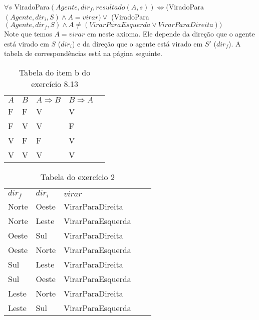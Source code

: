 \documentclass[12pt,letterpaper]{article}
\begin{document}
	$\forall s$ ViradoPara$(Agente, dir_f, resultado(A, s)) \Leftrightarrow $(ViradoPara$(Agente, dir_i, S)\land A = virar) \lor $ (ViradoPara$(Agente, dir_f, S) \land A \neq (VirarParaEsquerda \lor VirarParaDireita))$ \\
	
	Note que temos $A = virar$ em neste axioma. Ele depende da direção que o agente está virado em $S$ ($dir_i$) e da direção que o agente está virado em $S'$ ($dir_f$). A tabela de correspondências está na página seguinte.
	
	
	\newpage 
	
	\begin{table}[]
		\centering
		\caption{Tabela do item b do exercício 8.13}
		\label{my-label}
		\begin{tabular}{|l|l|l|l|l}
			\cline{1-4}
			$A$ & $B$ & $A \Rightarrow B$ & $B \Rightarrow A$ &  \\ \cline{1-4}
			F   & F   & V                 & V                 &  \\ \cline{1-4}
			F   & V   & V                 & F                 &  \\ \cline{1-4}
			V   & F   & F                 & V                 &  \\ \cline{1-4}
			V   & V   & V                 & V                 &  \\ \cline{1-4}
		\end{tabular}
	\end{table}
	
	\begin{table}[]
		\centering
		\caption{Tabela do exercício 2}
		\label{my-label}
		\begin{tabular}{|l|l|l|ll}
			\cline{1-3}
			$dir_f$ & $dir_i$ & $virar$             &  &  \\ \cline{1-3}
			Norte   & Oeste   & VirarParaDireita    &  &  \\ \cline{1-3}
			Norte   & Leste   & VirarParaEsquerda   &  &  \\ \cline{1-3}
		    Oeste   & Sul     & VirarParaDireita    &  &  \\ \cline{1-3}
			Oeste   & Norte   & VirarParaEsquerda   &  &  \\ \cline{1-3}
			Sul     & Leste   & VirarParaDireita    &  &  \\ \cline{1-3}
			Sul     & Oeste   & VirarParaEsquerda   &  &  \\ \cline{1-3}
			Leste   & Norte   & VirarParaDireita    &  &  \\ \cline{1-3}
			Leste   & Sul     & VirarParaEsquerda   &  &  \\ \cline{1-3}
		\end{tabular}
	\end{table}
			 
\end{document}

